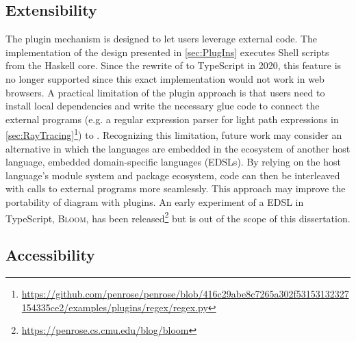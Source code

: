 

\subsection{Extensibility}
\label{sec:penrose-extensibility-limitation}

The plugin mechanism is designed to let \Penrose{} users leverage external code. The implementation of the design presented in \cref{sec:PlugIns} executes Shell scripts from the Haskell core. Since the rewrite of \Penrose{} to TypeScript in 2020, this feature is no longer supported since this exact implementation would not work in web browsers.
A practical limitation of the plugin approach is that \Penrose{} users need to install local dependencies and write the necessary glue code to connect the external programs (e.g. a regular expression parser for light path expressions in \cref{sec:RayTracing}\footnote{\url{https://github.com/penrose/penrose/blob/416c29abe8c7265a302f53153132327154335ce2/examples/plugins/regex/regex.py}}) to \Penrose{}. Recognizing this limitation, future work may consider an alternative in which the \Penrose{} languages are embedded in the ecosystem of another host language, \ie embedded domain-specific languages (EDSLs). By relying on the host language's module system and package ecosystem, \Penrose{} code can then be interleaved with calls to external programs more seamlessly. This approach may improve the portability of \Penrose{} diagram with plugins. An early experiment of a \Penrose{} EDSL in TypeScript, \textsc{Bloom}, has been released\footnote{\url{https://penrose.cs.cmu.edu/blog/bloom}} but is out of the scope of this dissertation.

\subsection{Accessibility}
\label{sec:Accessibility}

